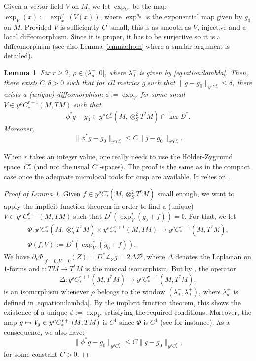 \documentclass[JEP,XML,SOM,Unicode,NoFloatCountersInSection]{cedram}
\newcommand\mto{\mathchoice{\longmapsto}{\mapsto}{\mapsto}{\mapsto}}
\newcommand{\mc}{\mathcal}
\theoremstyle{plain}
\newtheorem{lemma}{Lemma}[section]
\theoremstyle{definition}
\begin{document}
Given a vector field $V$ on $M$, we let $\exp_V$ be the map $\exp_V(x) := \exp_x^{g_0}(V(x))$, where $\exp^{g_0}$ is the exponential map given by $g_0$ on $M$. Provided $V$ is sufficiently $C^1$ small, this is as smooth as $V$, injective and a local diffeomorphism. Since it is proper, it has to be surjective so it is a diffeomorphism (see also Lemma \ref{lemma:hom} where a similar argument is detailed).

\begin{lemma}
\label{lemma:solenoidal-reduction}
Fix $r \geq 2$, $\rho \in (\lambda_d^-,0]$, where $\lambda_d^-$ is given by \eqref{equation:lambda}. Then, there exists $C, \delta > 0$ such that for all metrics $g$ such that $\|g-g_0\|_{y^{\rho}C^r_*} \leq \delta$, there exists a (unique) diffeomorphism $\phi := \exp_V$ for some small $V \in y^{\rho}C^{r+1}_*(M,TM)$ such that
\[
\phi^*g-g_0 \in y^{\rho}C^r_*(M,\otimes^2_S T^*M) \cap \ker D^*.
\]
Moreover,
\begin{equation}
\label{equation:kikoo}
\|\phi^*g-g_0\|_{y^\rho C^r_*} \leq C \|g-g_0\|_{y^\rho C^r_*}.
\end{equation}
\end{lemma}

When $r$ takes an integer value, one really needs to use the Hölder-Zygmund space~$C^r_*$ (and not the usual $C^r$-spaces). The proof is the same as in the compact case once the adequate microlocal tools for cusp are available. It relies on \cite[Lem.\,5.4]{Bonthonneau-Lefeuvre-19-1}.

\begin{proof}[Proof of Lemma \ref{lemma:solenoidal-reduction}]
Given $f \in y^{\rho}C^r_*(M,\otimes^2_S T^*M)$ small enough, we want to apply the implicit function theorem in order to find a (unique) $V \in y^{\rho}C^{r+1}_*(M,TM)$ such that $D^*(\exp_V^*(g_0+f)) = 0$. For that, we let
\begin{gather*}
\Phi : y^{\rho}C^r_*(M,\otimes^2_S T^*M) \times y^{\rho}C^{r+1}_*(M,TM) \to y^{\rho}C^{r-1}_*(M,T^*M), \\
\Phi(f,V) := D^*(\exp_V^*(g_0+f)).
\end{gather*}
We have $\partial_V \Phi|_{f=0, V=0}(Z) = D^* \mc{L}_Z g = 2 \Delta Z^\sharp$, where $\Delta$ denotes the Laplacian on $1$\nobreakdash-forms and $\sharp : TM \to T^*M$ is the musical isomorphism. But by \cite[Lem.\,5.4]{Bonthonneau-Lefeuvre-19-1}, the operator
\[
\Delta : y^{\rho}C^{r+1}_*(M,T^*M) \to y^{\rho}C^{r-1}_*(M,T^*M),
\]
is an isomorphism whenever $\rho$ belongs to the window $(\lambda_d^-,\lambda_d^+)$, where $\lambda_d^\pm$ is defined in \eqref{equation:lambda}. By the implicit function theorem, this shows the existence of a unique $\phi := \exp_V$ satisfying the required conditions. Moreover, the map $g \mto V_g \in y^\rho C^{r+1}_*(M,TM)$ is $C^1$ since $\Phi$ is $C^1$ (see \cite{Guillarmou-Lefeuvre-18} for instance). As a consequence, we also have:
\[
\|\phi^*g-g_0\|_{y^\rho C^r_*} \leq C \|g-g_0\|_{y^\rho C^r_*},
\]
for some constant $C > 0$.
\end{proof}
\end{document}
